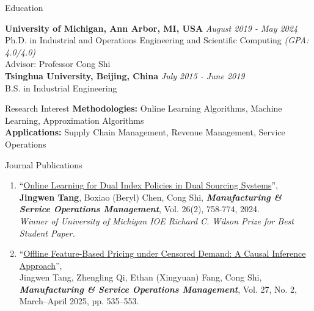 \documentclass{resume}
\begin{document}

\begin{rSection}{Education}

{\bf University of Michigan, Ann Arbor, MI, USA} \hfill {\em August 2019 - May 2024} 
\\ Ph.D. in Industrial and Operations Engineering and Scientific Computing \hfill{\em  (GPA: 4.0/4.0)}
\\Advisor: Professor Cong Shi \hfill
\\{\bf Tsinghua University, Beijing, China} \hfill {\em July 2015 - June 2019} 
\\ B.S. in Industrial Engineering
\end{rSection}

\begin{rSection}{Research Interest}
 {\bf Methodologies: } Online Learning Algorithms, Machine Learning, Approximation Algorithms\\
 {\bf Applications: } Supply Chain Management, Revenue Management, Service Operations
\end{rSection}


\begin{rSection}{Journal Publications}
\begin{enumerate}
    \item ``\href{https://pubsonline.informs.org/doi/10.1287/msom.2022.0323}{Online Learning for Dual Index Policies in Dual Sourcing Systems}'', \\ \textbf{Jingwen Tang}, Boxiao (Beryl) Chen, Cong Shi, \emph{\textbf{Manufacturing \& Service Operations Management}}, Vol. 26(2), 758-774, 2024. \\
    {\it Winner of University of Michigan IOE Richard C. Wilson Prize for Best Student Paper.}

  \item ``\href{https://pubsonline.informs.org/doi/10.1287/msom.2024.1061}{Offline Feature-Based Pricing under Censored Demand: A Causal Inference Approach}'', \\Jingwen Tang, Zhengling Qi, Ethan (Xingyuan) Fang, Cong Shi, \emph{\textbf{Manufacturing \& Service Operations Management}}, Vol. 27, No. 2, March–April 2025, pp. 535–553. 

\end{enumerate}
\end{rSection}
\end{document}
